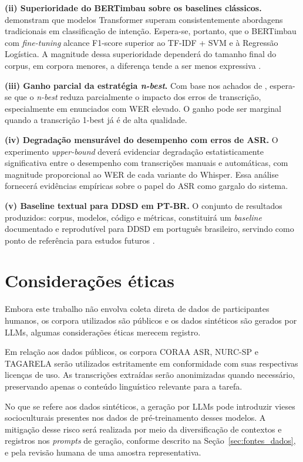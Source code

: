 \documentclass[
    12pt,                %
    openright,           %
    oneside,             %
    a4paper,             %
    english,             %
    brazil               %
]{abntex2}
\begin{document}
\textbf{(ii) Superioridade do BERTimbau sobre os baselines clássicos.}  demonstram que modelos Transformer superam consistentemente abordagens tradicionais em classificação de intenção. Espera-se, portanto, que o BERTimbau com \textit{fine-tuning} alcance F1-score superior ao TF-IDF + SVM e à Regressão Logística. A magnitude dessa superioridade dependerá do tamanho final do corpus, em corpora menores, a diferença tende a ser menos expressiva \cite{Weld2022}.

\textbf{(iii) Ganho parcial da estratégia \textit{n-best}.} Com base nos achados de , espera-se que o \textit{n-best} reduza parcialmente o impacto dos erros de transcrição, especialmente em enunciados com WER elevado. O ganho pode ser marginal quando a transcrição 1-best já é de alta qualidade.

\textbf{(iv) Degradação mensurável do desempenho com erros de ASR.} O experimento \textit{upper-bound} deverá evidenciar degradação estatisticamente significativa entre o desempenho com transcrições manuais e automáticas, com magnitude proporcional ao WER de cada variante do Whisper. Essa análise fornecerá evidências empíricas sobre o papel do ASR como gargalo do sistema.

\textbf{(v) Baseline textual para DDSD em PT-BR.} O conjunto de resultados produzidos: corpus, modelos, código e métricas, constituirá um \textit{baseline} documentado e reprodutível para DDSD em português brasileiro, servindo como ponto de referência para estudos futuros \cite{Wazlawick2020, Dighe2024}.

\section{Considerações éticas}
\label{sec:eticas}

Embora este trabalho não envolva coleta direta de dados de participantes humanos, os corpora utilizados são públicos e os dados sintéticos são gerados por LLMs, algumas considerações éticas merecem registro.

Em relação aos dados públicos, os corpora CORAA ASR, NURC-SP e TAGARELA serão utilizados estritamente em conformidade com suas respectivas licenças de uso. As transcrições extraídas serão anonimizadas quando necessário, preservando apenas o conteúdo linguístico relevante para a tarefa.

No que se refere aos dados sintéticos, a geração por LLMs pode introduzir vieses socioculturais presentes nos dados de pré-treinamento desses modelos. A mitigação desse risco será realizada por meio da diversificação de contextos e registros nos \textit{prompts} de geração, conforme descrito na Seção~\ref{sec:fontes_dados}, e pela revisão humana de uma amostra representativa.
\end{document}
